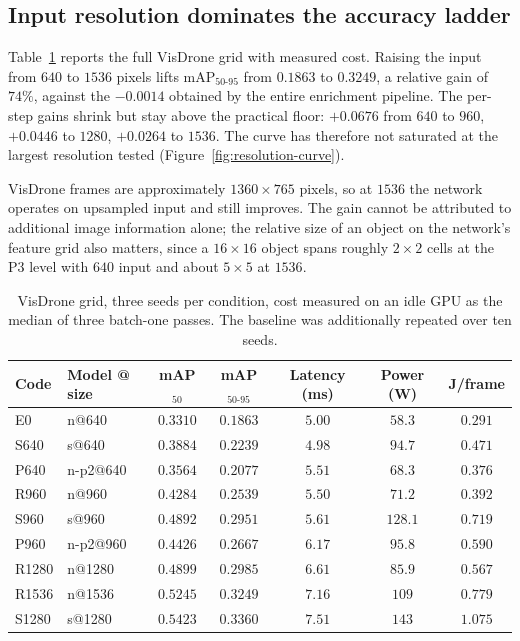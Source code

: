 \subsection{Input resolution dominates the accuracy ladder}
\label{sec:results:resolution}

Table~\ref{tab:visdrone-grid} reports the full VisDrone grid with measured cost. Raising the
input from $640$ to $1536$ pixels lifts mAP$_{50\text{-}95}$ from $0.1863$ to $0.3249$, a
relative gain of $74\%$, against the $-0.0014$ obtained by the entire enrichment pipeline.
The per-step gains shrink but stay above the practical floor: $+0.0676$ from $640$ to $960$,
$+0.0446$ to $1280$, $+0.0264$ to $1536$. The curve has therefore not saturated at the
largest resolution tested (Figure~\ref{fig:resolution-curve}).

VisDrone frames are approximately $1360 \times 765$ pixels, so at $1536$ the network operates
on upsampled input and still improves. The gain cannot be attributed to additional image
information alone; the relative size of an object on the network's feature grid also
matters, since a $16 \times 16$ object spans roughly $2 \times 2$ cells at the P3 level with
$640$ input and about $5 \times 5$ at $1536$.

\begin{table}[t]
\centering
\caption{VisDrone grid, three seeds per condition, cost measured on an idle GPU as the
median of three batch-one passes. The baseline was additionally repeated over ten seeds.}
\label{tab:visdrone-grid}
\begin{tabular}{llccccc}
\toprule
Code & Model @ size & mAP$_{50}$ & mAP$_{50\text{-}95}$ & Latency (ms) & Power (W) & J/frame \\
\midrule
E0    & n@640      & $0.3310$ & $0.1863$ & $5.00$ & $58.3$  & $0.291$ \\
S640  & s@640      & $0.3884$ & $0.2239$ & $4.98$ & $94.7$  & $0.471$ \\
P640  & n-p2@640   & $0.3564$ & $0.2077$ & $5.51$ & $68.3$  & $0.376$ \\
R960  & n@960      & $0.4284$ & $0.2539$ & $5.50$ & $71.2$  & $0.392$ \\
S960  & s@960      & $0.4892$ & $0.2951$ & $5.61$ & $128.1$ & $0.719$ \\
P960  & n-p2@960   & $0.4426$ & $0.2667$ & $6.17$ & $95.8$  & $0.590$ \\
R1280 & n@1280     & $0.4899$ & $0.2985$ & $6.61$ & $85.9$  & $0.567$ \\
R1536 & n@1536     & $0.5245$ & $0.3249$ & $7.16$ & $109$   & $0.779$ \\
S1280 & s@1280     & $0.5423$ & $0.3360$ & $7.51$ & $143$   & $1.075$ \\
\bottomrule
\end{tabular}
\end{table}

